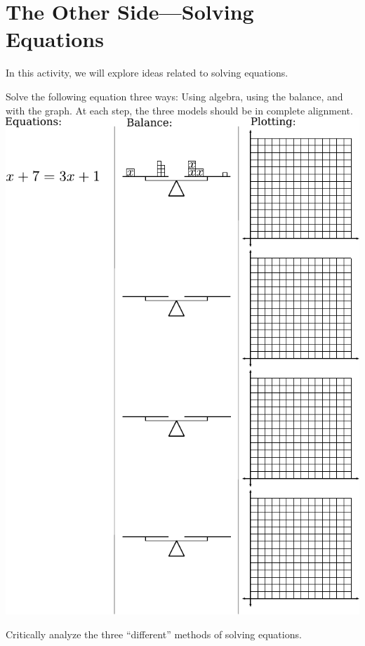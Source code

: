 \newpage
\section{The Other Side---Solving Equations}\label{A:otherSide}


In this activity, we will explore ideas related to solving equations.

\begin{prob}
Solve the following equation three ways: Using algebra, using the
balance, and with the graph. At each step, the three models should be in
complete alignment.
\[
\]\includegraphics[scale=0.8]{../graphics/eqBalGraph.pdf}

\end{prob}

\begin{prob}
Critically analyze the three ``different'' methods of solving
equations. 
\end{prob}

